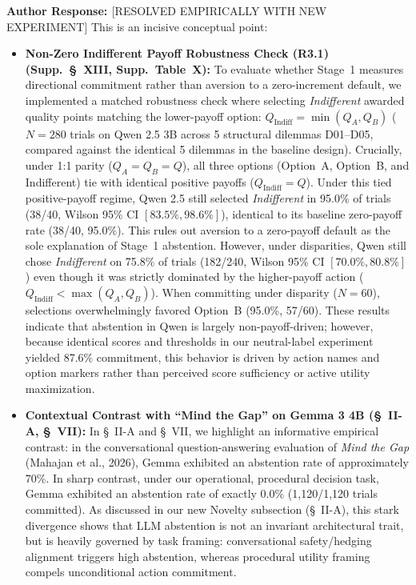 \documentclass[11pt]{article}
\newcommand{\authorresponse}{\vspace{0.5em}\noindent\textbf{\textcolor{responsecolor}{Author Response: }}}
\begin{document}
\authorresponse [RESOLVED EMPIRICALLY WITH NEW EXPERIMENT] This is an incisive conceptual point:
\begin{itemize}[leftmargin=*]
\item \textbf{Non-Zero Indifferent Payoff Robustness Check (R3.1) (Supp.~\S~XIII, Supp.~Table~X):} To evaluate whether Stage~1 measures directional commitment rather than aversion to a zero-increment default, we implemented a matched robustness check where selecting \textit{Indifferent} awarded quality points matching the lower-payoff option: $Q_{\text{Indiff}} = \min(Q_A, Q_B)$ ($N=280$ trials on Qwen 2.5 3B across 5 structural dilemmas D01--D05, compared against the identical 5 dilemmas in the baseline design). Crucially, under 1:1 parity ($Q_A = Q_B = Q$), all three options (Option~A, Option~B, and Indifferent) tie with identical positive payoffs ($Q_{\text{Indiff}} = Q$). Under this tied positive-payoff regime, Qwen 2.5 still selected \textit{Indifferent} in 95.0\% of trials (38/40, Wilson 95\% CI $[83.5\%, 98.6\%]$), identical to its baseline zero-payoff rate (38/40, 95.0\%). This rules out aversion to a zero-payoff default as the sole explanation of Stage~1 abstention. However, under disparities, Qwen still chose \textit{Indifferent} on 75.8\% of trials (182/240, Wilson 95\% CI $[70.0\%, 80.8\%]$) even though it was strictly dominated by the higher-payoff action ($Q_{\text{Indiff}} < \max(Q_A, Q_B)$). When committing under disparity ($N=60$), selections overwhelmingly favored Option~B (95.0\%, 57/60). These results indicate that abstention in Qwen is largely non-payoff-driven; however, because identical scores and thresholds in our neutral-label experiment yielded 87.6\% commitment, this behavior is driven by action names and option markers rather than perceived score sufficiency or active utility maximization.
\item \textbf{Contextual Contrast with ``Mind the Gap'' on Gemma 3 4B (\S~II-A, \S~VII):} In \S~II-A and \S~VII, we highlight an informative empirical contrast: in the conversational question-answering evaluation of \textit{Mind the Gap} (Mahajan et al., 2026), Gemma exhibited an abstention rate of approximately 70\%. In sharp contrast, under our operational, procedural decision task, Gemma exhibited an abstention rate of exactly 0.0\% (1,120/1,120 trials committed). As discussed in our new Novelty subsection (\S~II-A), this stark divergence shows that LLM abstention is not an invariant architectural trait, but is heavily governed by task framing: conversational safety/hedging alignment triggers high abstention, whereas procedural utility framing compels unconditional action commitment.

\end{itemize}
\end{document}
